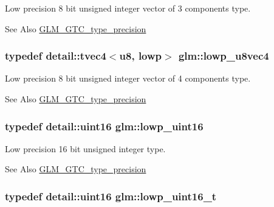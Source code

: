 Low precision 8 bit unsigned integer vector of 3 components type. \begin{DoxySeeAlso}{See Also}
\hyperlink{group__gtc__type__precision}{G\-L\-M\-\_\-\-G\-T\-C\-\_\-type\-\_\-precision} 
\end{DoxySeeAlso}
\hypertarget{group__gtc__type__precision_ga98f82380862128fac9afae1b53840562}{
\subsubsection[{lowp\-\_\-u8vec4}]{\setlength{\rightskip}{0pt plus 5cm}typedef detail\-::tvec4$<$u8, lowp$>$ {\bf glm\-::lowp\-\_\-u8vec4}}}\label{group__gtc__type__precision_ga98f82380862128fac9afae1b53840562}
Low precision 8 bit unsigned integer vector of 4 components type. \begin{DoxySeeAlso}{See Also}
\hyperlink{group__gtc__type__precision}{G\-L\-M\-\_\-\-G\-T\-C\-\_\-type\-\_\-precision} 
\end{DoxySeeAlso}
\hypertarget{group__gtc__type__precision_ga9b8409887319f62f06e664f6ca121b9d}{
\subsubsection[{lowp\-\_\-uint16}]{\setlength{\rightskip}{0pt plus 5cm}typedef detail\-::uint16 {\bf glm\-::lowp\-\_\-uint16}}}\label{group__gtc__type__precision_ga9b8409887319f62f06e664f6ca121b9d}
Low precision 16 bit unsigned integer type. \begin{DoxySeeAlso}{See Also}
\hyperlink{group__gtc__type__precision}{G\-L\-M\-\_\-\-G\-T\-C\-\_\-type\-\_\-precision} 
\end{DoxySeeAlso}
\hypertarget{group__gtc__type__precision_ga9a71176a4e5bc61951f9e9197d9c80e1}{
\subsubsection[{lowp\-\_\-uint16\-\_\-t}]{\setlength{\rightskip}{0pt plus 5cm}typedef detail\-::uint16 {\bf glm\-::lowp\-\_\-uint16\-\_\-t}}}\label{group__gtc__type__precision_ga9a71176a4e5bc61951f9e9197d9c80e1}
